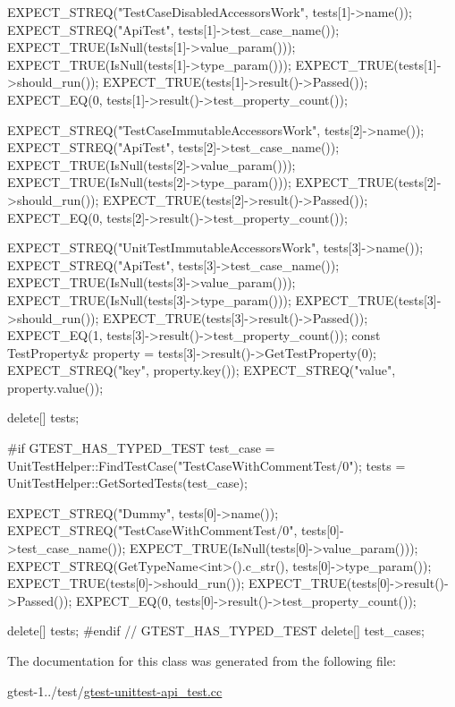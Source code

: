 \begin{DoxyCode}
{    EXPECT_STREQ("TestCaseDisabledAccessorsWork", tests[1]->name());
    EXPECT_STREQ("ApiTest", tests[1]->test_case_name());
    EXPECT_TRUE(IsNull(tests[1]->value_param()));
    EXPECT_TRUE(IsNull(tests[1]->type_param()));
    EXPECT_TRUE(tests[1]->should_run());
    EXPECT_TRUE(tests[1]->result()->Passed());
    EXPECT_EQ(0, tests[1]->result()->test_property_count());

    EXPECT_STREQ("TestCaseImmutableAccessorsWork", tests[2]->name());
    EXPECT_STREQ("ApiTest", tests[2]->test_case_name());
    EXPECT_TRUE(IsNull(tests[2]->value_param()));
    EXPECT_TRUE(IsNull(tests[2]->type_param()));
    EXPECT_TRUE(tests[2]->should_run());
    EXPECT_TRUE(tests[2]->result()->Passed());
    EXPECT_EQ(0, tests[2]->result()->test_property_count());

    EXPECT_STREQ("UnitTestImmutableAccessorsWork", tests[3]->name());
    EXPECT_STREQ("ApiTest", tests[3]->test_case_name());
    EXPECT_TRUE(IsNull(tests[3]->value_param()));
    EXPECT_TRUE(IsNull(tests[3]->type_param()));
    EXPECT_TRUE(tests[3]->should_run());
    EXPECT_TRUE(tests[3]->result()->Passed());
    EXPECT_EQ(1, tests[3]->result()->test_property_count());
    const TestProperty& property = tests[3]->result()->GetTestProperty(0);
    EXPECT_STREQ("key", property.key());
    EXPECT_STREQ("value", property.value());

    delete[] tests;

#if GTEST_HAS_TYPED_TEST
    test_case = UnitTestHelper::FindTestCase("TestCaseWithCommentTest/0");
    tests = UnitTestHelper::GetSortedTests(test_case);

    EXPECT_STREQ("Dummy", tests[0]->name());
    EXPECT_STREQ("TestCaseWithCommentTest/0", tests[0]->test_case_name());
    EXPECT_TRUE(IsNull(tests[0]->value_param()));
    EXPECT_STREQ(GetTypeName<int>().c_str(), tests[0]->type_param());
    EXPECT_TRUE(tests[0]->should_run());
    EXPECT_TRUE(tests[0]->result()->Passed());
    EXPECT_EQ(0, tests[0]->result()->test_property_count());

    delete[] tests;
#endif  // GTEST_HAS_TYPED_TEST
    delete[] test_cases;
  }
\end{DoxyCode}


\-The documentation for this class was generated from the following file\-:\begin{DoxyCompactItemize}
\item 
gtest-\/1../test/\hyperlink{gtest-unittest-api__test_8cc}{gtest-\/unittest-\/api\-\_\-test.\-cc}\end{DoxyCompactItemize}
